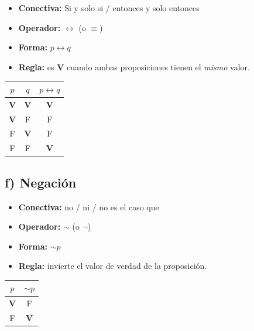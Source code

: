 \documentclass[12pt,a4paper]{article}
\newcommand{\TV}[1]{\textbf{#1}}   %
\begin{document}
\begin{minipage}{0.55\linewidth}
\begin{itemize}[leftmargin=*]
  \item \textbf{Conectiva:} Si y solo si / entonces y solo entonces
  \item \textbf{Operador:} $\leftrightarrow$ (o $\equiv$)
  \item \textbf{Forma:} $p \leftrightarrow q$
  \item \textbf{Regla:} es \textbf{V} cuando ambas proposiciones tienen el \emph{mismo} valor.
\end{itemize}
\end{minipage}%
\hfill
\begin{minipage}{0.38\linewidth}
\centering
\begin{tabular}{cc|c}
\toprule
$p$ & $q$ & $p \leftrightarrow q$ \\
\midrule
\TV{V} & \TV{V} & \TV{V} \\
\TV{V} & F      & F      \\
F      & \TV{V} & F      \\
F      & F      & \TV{V} \\
\bottomrule
\end{tabular}
\end{minipage}

\bigskip

\subsection{f) Negación}

\begin{minipage}{0.55\linewidth}
\begin{itemize}[leftmargin=*]
  \item \textbf{Conectiva:} no / ni / no es el caso que
  \item \textbf{Operador:} $\sim$ (o $\neg$)
  \item \textbf{Forma:} $\sim p$
  \item \textbf{Regla:} invierte el valor de verdad de la proposición.
\end{itemize}
\end{minipage}%
\hfill
\begin{minipage}{0.38\linewidth}
\centering
\begin{tabular}{c|c}
\toprule
$p$ & $\sim p$ \\
\midrule
\TV{V} & F      \\
F      & \TV{V} \\
\bottomrule
\end{tabular}
\end{minipage}
\end{document}
